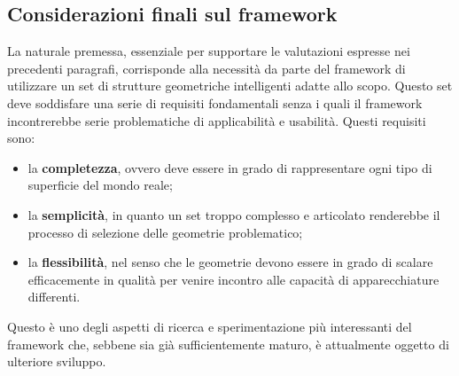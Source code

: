 \subsection{Considerazioni finali sul framework}
La naturale premessa, essenziale per supportare le valutazioni espresse nei precedenti paragrafi, corrisponde alla necessit\`a da parte del framework di utilizzare un set di strutture geometriche intelligenti adatte allo scopo. Questo set deve soddisfare una serie di requisiti fondamentali senza i quali il framework incontrerebbe serie problematiche di applicabilit\`a e usabilit\`a. Questi requisiti sono:
\begin{itemize}
	\item  la \textbf{completezza}, ovvero deve essere in grado di rappresentare ogni tipo di superficie del mondo reale;
	\item  la \textbf{semplicit\`a}, in quanto un set troppo complesso e articolato renderebbe il processo di selezione delle geometrie problematico;
	\item  la \textbf{flessibilit\`a}, nel senso che le geometrie devono essere in grado di scalare efficacemente in qualit\`a per venire incontro alle capacit\`a di apparecchiature differenti.
\end{itemize}

Questo \`e uno degli aspetti di ricerca e sperimentazione pi\`u interessanti del framework che, sebbene sia gi\`a sufficientemente maturo, \`e attualmente oggetto di ulteriore sviluppo.

